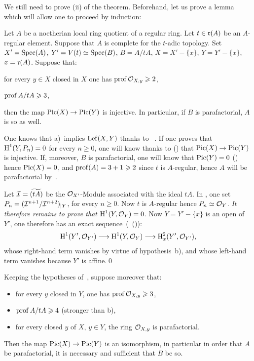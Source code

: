 \medskip
We still need to prove (ii) of the theorem. Beforehand, let us prove a lemma which will allow one to proceed by induction:

\begin{lemma} \label{XI.3.16}
Let $A$ be a noetherian local ring quotient of a regular ring. Let $t\in\mathfrak{r}(A)$ be an $A$-regular element. Suppose that $A$ is complete for the $t$-adic topology. Set $X'=\operatorname{Spec}(A)$, $Y'=V(t)\simeq \operatorname{Spec}(B)$, $B=A/tA$, $X=X'-\{x\}$, $Y=Y'-\{x\}$, $x=\mathfrak{r}(A)$. Suppose that:
\begin{enumeratea}
\item
for every $y\in X$ closed in $X$ one has $\operatorname{prof}{\mathcal O}_{X, y}\geqslant 2$,
\item
$\operatorname{prof} A/tA\geqslant 3$,
\end{enumeratea}
\noindent
then the map $\Pic(X)\to\Pic(Y)$ is injective. In particular, if $B$ is parafactorial, $A$ is so as well.
\end{lemma}

One knows that a)~implies $\operatorname{Lef}(X, Y)$ thanks to ~. If one proves that $\operatorname{H}^1(Y, P_n)=0$ for every $n\geq 0$, one will know thanks to () that $\Pic(X)\to\Pic(Y)$ is injective. If, moreover, $B$ is parafactorial, one will know that $\operatorname{Pic}(Y)=0$ () hence $\operatorname{Pic}(X)=0$, and $\operatorname{prof}(A)=3+1\geqslant 2$ since $t$ is $A$-regular, hence $A$ will be parafactorial by~.

Let ${\mathcal I}=\widetilde{(tA)}$ be the ${\mathcal O}_{X'}$-Module associated with the ideal $tA$. In \numero {}, one set $P_n = ({\mathcal I}^{n+1}/{\mathcal I}^{n+2})_{|Y}$, for every $n\geq 0$. Now $t$ is $A$-regular hence $P_n\simeq {\mathcal O}_Y$. \emph{It therefore remains to prove that $\operatorname{H}^1(Y, {\mathcal O}_Y)=0$.} Now $Y = Y'-\{x\}$ is an open of $Y'$, one therefore has an exact sequence~(~()):
\[
\H^1(Y', \Oo_{Y'})\to\H^1(Y, \Oo_{Y})\to\H^2_x(Y', \Oo_{Y'}){\quoi},
\]
whose right-hand term vanishes by virtue of hypothesis~b), and whose left-hand term vanishes because $Y'$ is affine.\qed

\begin{lemma} \label{XI.3.17}
Keeping the hypotheses of~, suppose moreover that:
\begin{itemize}
\item[c)] for every $y$ closed in $Y$, one has $\operatorname{prof}{\mathcal O}_{X, y}\geqslant 3$,
\item[d)] $\operatorname{prof} A/tA\geqslant 4$ (stronger than b),
\item[e)] for every closed $y$ of $X$, $y\in Y$, the ring ${\mathcal O}_{X, y}$ is parafactorial.
\end{itemize}
Then the map $\Pic(X)\to\Pic(Y)$ is an isomorphism, in particular in order that $A$ be parafactorial, it is necessary and sufficient that $B$ be so.
\end{lemma}

